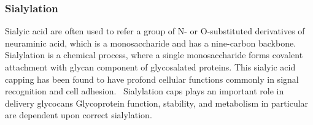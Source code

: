 \subsubsection {Sialylation}
Sialyic acid are often used to refer a group of N- or O-substituted derivatives of neuraminic acid, which is a monosaccharide and has a nine-carbon backbone.~\cite{Vocadlo_2009} Sialylation is a chemical process, where a single monosaccharide forms covalent attachment with glycan component of glycosalated proteins. This sialyic acid capping has been found to have profond cellular functions commonly in signal recognition and cell adhesion.~\cite{Bhide_2016} Sialylation caps plays an important role in delivery glycocans Glycoprotein function, stability, and metabolism in particular are dependent upon correct sialylation.